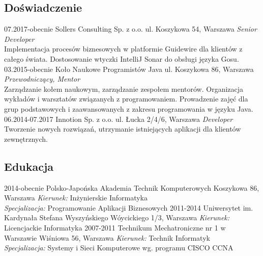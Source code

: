 \documentclass[]{friggeri-cv} %
\begin{document}
	\begin{absolutelynopagebreak}
		\section{Doświadczenie}
		\begin{entrylist}
			\entry
			{07.2017-obecnie}
			{Sollers Consulting Sp. z o.o.}
			{ul. Koszykowa 54, Warszawa}
			{\emph{Senior Developer}\\
				Implementacja procesów biznesowych w platformie Guidewire dla klientów z całego świata. Dostosowanie wtyczki IntelliJ Sonar do obsługi języka Gosu.
			}
			\entry
			{03.2015-obecnie}
			{Koło Naukowe Programistów Java}
			{ul. Koszykowa 86, Warszawa}
			{\emph{Przewodniczący, Mentor}\\
				Zarządzanie kołem naukowym, zarządzanie zespołem mentorów. Organizacja wykładów i warsztatów związanych z programowaniem. Prowadzenie zajęć dla grup podstawowych i zaawansowanych z zakresu programowania w języku Java.
			}
			\entry
			{06.2014-07.2017}
			{Innotion Sp. z o.o.}
			{ul. Łucka 2/4/6, Warszawa}
			{\emph{Developer}\\
				Tworzenie nowych rozwiązań, utrzymanie istniejących aplikacji dla klientów zewnętrznych.
			}
		\end{entrylist}
	\end{absolutelynopagebreak}
	
	\begin{absolutelynopagebreak}
		\section{Edukacja}
		\begin{entrylist}
			\entry
			{2014-obecnie}
			{Polsko-Japońska Akademia Technik Komputerowych}
			{Koszykowa 86, Warszawa}
			{\emph{Kierunek:} Inżynierskie Informatyka\\
			\emph{Specjalizacja:} Programowanie Aplikacji Biznesowych}
			\entry
			{2011-2014}
			{Uniwersytet im. Kardynała Stefana Wyszyńskiego}
			{Wóycickiego 1/3, Warszawa}
			{\emph{Kierunek:} Licencjackie Informatyka}
			\entry
			{2007-2011}
			{Technikum Mechatroniczne nr 1 w Warszawie}
			{Wiśniowa 56, Warszawa}
			{\emph{Kierunek:} Technik Informatyk\\
			\emph{Specjalizacja:} Systemy i Sieci Komputerowe wg. programu CISCO CCNA}
		\end{entrylist}
	\end{absolutelynopagebreak}
	
\end{document}
